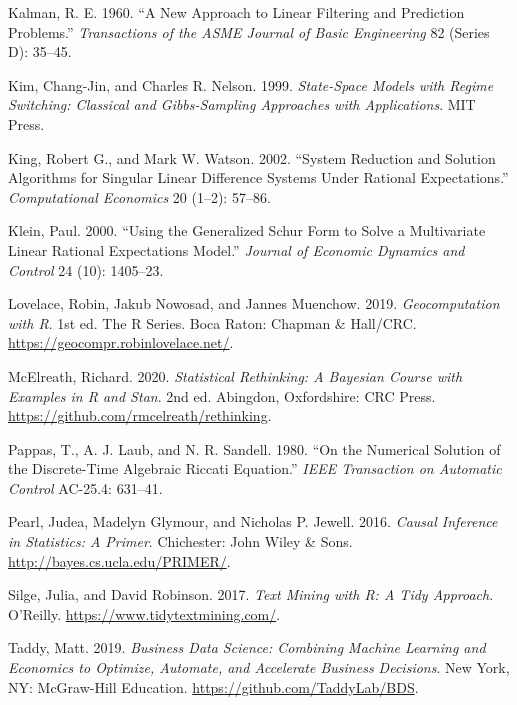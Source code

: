 \documentclass[
  letterpaper,
]{book}
\newlength{\cslhangindent}
\newlength{\cslentryspacingunit} %
\newenvironment{CSLReferences}[2] %
 {%
  \setlength{\parindent}{0pt}
  \ifodd #1
  \let\oldpar\par
  \def\par{\hangindent=\cslhangindent\oldpar}
  \fi
  \setlength{\parskip}{#2\cslentryspacingunit}
 }%
 {}
\begin{document}
\begin{CSLReferences}{1}{0}
\leavevmode{}%
Kalman, R. E. 1960. {``A New Approach to Linear Filtering and Prediction
Problems.''} \emph{Transactions of the ASME Journal of Basic
Engineering} 82 (Series D): 35--45.

\leavevmode{}%
Kim, Chang-Jin, and Charles R. Nelson. 1999. \emph{State-Space Models
with Regime Switching: Classical and Gibbs-Sampling Approaches with
Applications}. MIT Press.

\leavevmode{}%
King, Robert G., and Mark W. Watson. 2002. {``System Reduction and
Solution Algorithms for Singular Linear Difference Systems Under
Rational Expectations.''} \emph{Computational Economics} 20 (1--2):
57--86.

\leavevmode{}%
Klein, Paul. 2000. {``Using the Generalized {S}chur Form to Solve a
Multivariate Linear Rational Expectations Model.''} \emph{Journal of
Economic Dynamics and Control} 24 (10): 1405--23.

\leavevmode{}%
Lovelace, Robin, Jakub Nowosad, and Jannes Muenchow. 2019.
\emph{Geocomputation with {R}}. 1st ed. The {R} Series. Boca Raton:
Chapman \& Hall/CRC. \url{https://geocompr.robinlovelace.net/}.

\leavevmode{}%
McElreath, Richard. 2020. \emph{Statistical Rethinking: A Bayesian
Course with Examples in {R} and Stan}. 2nd ed. Abingdon, Oxfordshire:
CRC Press. \url{https://github.com/rmcelreath/rethinking}.

\leavevmode{}%
Pappas, T., A. J. Laub, and N. R. Sandell. 1980. {``On the Numerical
Solution of the Discrete-Time Algebraic Riccati Equation.''} \emph{IEEE
Transaction on Automatic Control} AC-25.4: 631--41.

\leavevmode{}%
Pearl, Judea, Madelyn Glymour, and Nicholas P. Jewell. 2016.
\emph{Causal Inference in Statistics: A Primer}. Chichester: John Wiley
\& Sons. \url{http://bayes.cs.ucla.edu/PRIMER/}.

\leavevmode{}%
Silge, Julia, and David Robinson. 2017. \emph{Text Mining with {R}: A
{T}idy Approach}. O'Reilly. \url{https://www.tidytextmining.com/}.

\leavevmode{}%
Taddy, Matt. 2019. \emph{Business Data Science: Combining Machine
Learning and Economics to Optimize, Automate, and Accelerate Business
Decisions}. New York, NY: McGraw-Hill Education.
\url{https://github.com/TaddyLab/BDS}.


\end{CSLReferences}
\end{document}
